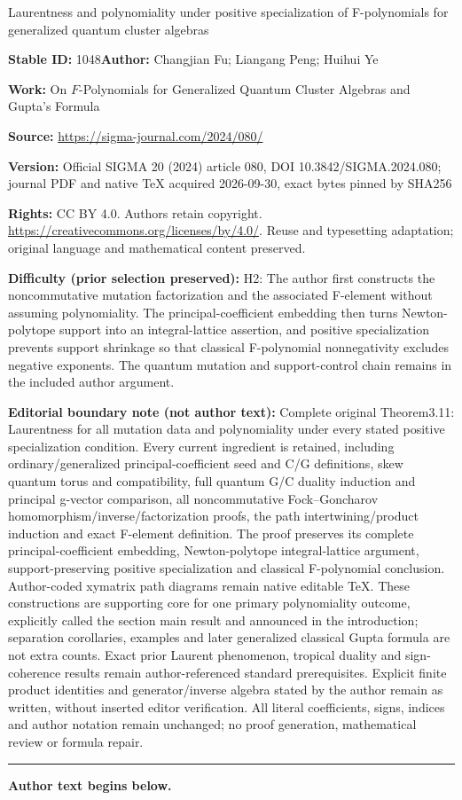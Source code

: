 \documentclass[11pt]{article}
\numberwithin{equation}{section}
\numberwithin{equation}{section}
\begin{document}
\begin{center}\Large Laurentness and polynomiality under positive specialization of F-polynomials for generalized quantum cluster algebras\end{center}
\noindent\textbf{Stable ID:} 1048\quad\textbf{Author:} Changjian Fu; Liangang Peng; Huihui Ye\par
\noindent\textbf{Work:} On $F$-Polynomials for Generalized Quantum Cluster Algebras and Gupta's Formula\par
\noindent\textbf{Source:} \url{https://sigma-journal.com/2024/080/}\par
\noindent\textbf{Version:} Official SIGMA 20 (2024) article 080, DOI 10.3842/SIGMA.2024.080; journal PDF and native TeX acquired 2026-09-30, exact bytes pinned by SHA256\par
\noindent\textbf{Rights:} CC BY 4.0. Authors retain copyright. \url{https://creativecommons.org/licenses/by/4.0/}. Reuse and typesetting adaptation; original language and mathematical content preserved.\par
\noindent\textbf{Difficulty (prior selection preserved):} {\CJKfont H2: The author first constructs the noncommutative mutation factorization and the associated F-element without assuming polynomiality. The principal-coefficient embedding then turns Newton-polytope support into an integral-lattice assertion, and positive specialization prevents support shrinkage so that classical F-polynomial nonnegativity excludes negative exponents. The quantum mutation and support-control chain remains in the included author argument.}\par
\medskip\noindent\textbf{Editorial boundary note (not author text):} Complete original Theorem3.11: Laurentness for all mutation data and polynomiality under every stated positive specialization condition. Every current ingredient is retained, including ordinary/generalized principal-coefficient seed and C/G definitions, skew quantum torus and compatibility, full quantum G/C duality induction and principal g-vector comparison, all noncommutative Fock–Goncharov homomorphism/inverse/factorization proofs, the path intertwining/product induction and exact F-element definition. The proof preserves its complete principal-coefficient embedding, Newton-polytope integral-lattice argument, support-preserving positive specialization and classical F-polynomial conclusion. Author-coded xymatrix path diagrams remain native editable TeX. These constructions are supporting core for one primary polynomiality outcome, explicitly called the section main result and announced in the introduction; separation corollaries, examples and later generalized classical Gupta formula are not extra counts. Exact prior Laurent phenomenon, tropical duality and sign-coherence results remain author-referenced standard prerequisites. Explicit finite product identities and generator/inverse algebra stated by the author remain as written, without inserted editor verification. All literal coefficients, signs, indices and author notation remain unchanged; no proof generation, mathematical review or formula repair.\par
\medskip\hrule\medskip\noindent\textbf{Author text begins below.}\par
\setcounter{section}{1}
\end{document}
